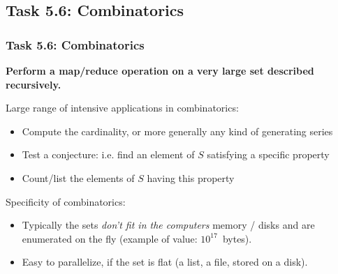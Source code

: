 \documentclass{beamer}
\begin{document}


\subsection{Task 5.6: Combinatorics}
\begin{frame}[fragile]
  \frametitle{Task 5.6: Combinatorics}

  \begin{center}
    {%
      \begin{minipage}{9cm}\Large\bf
        Perform a {\color{red}map/reduce} operation on a very large set
        described {\color{blue}recursively}.
      \end{minipage}
    }
  \end{center}
  \begin{block}{Large range of intensive applications in combinatorics:}
  \begin{itemize}
  \item Compute the cardinality, or more generally any kind of generating series
  \item Test a conjecture: i.e. find an element of $S$ satisfying a specific
    property %
  \item Count/list the elements of $S$ having this property
  \end{itemize}
\end{block}

  \begin{block}{Specificity of combinatorics:}
  \begin{itemize}
  \item Typically the sets \emph{don't fit in the computers} memory / disks
    and are enumerated on the fly (example of value: $10^{17}$~bytes).
  \item Easy to parallelize, if the set is flat (a list, a file, stored on a disk).
    \bigskip
  \end{itemize}
\end{block}
\end{frame}
\end{document}
